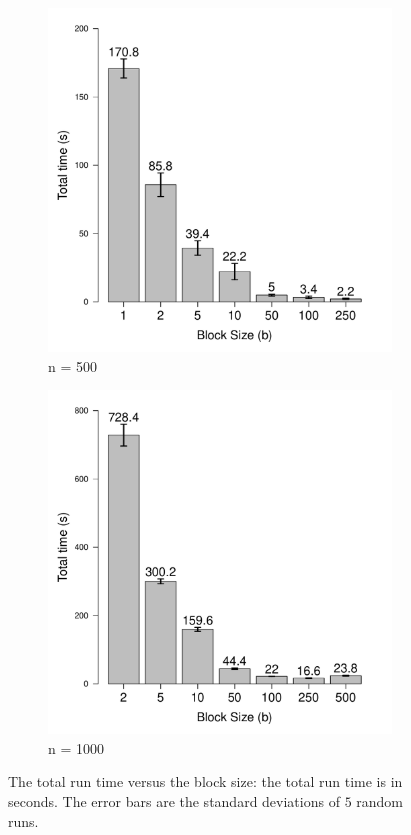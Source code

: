 \documentclass{article} %
\begin{document}
\begin{figure}[ht]
\centering
\begin{subfigure}[b]{0.45\textwidth}
\includegraphics[width = \textwidth]{time.pdf}
\caption{n = 500}
\end{subfigure}
\begin{subfigure}[b]{0.45\textwidth}
\includegraphics[width = \textwidth]{time1000.pdf}
\caption{n = 1000}
\end{subfigure}
\caption{The total run time versus the block size: the total run time is in seconds. The error bars are the standard deviations of $5$ random runs.}
\label{fig:time-result}
\end{figure}
\end{document}
